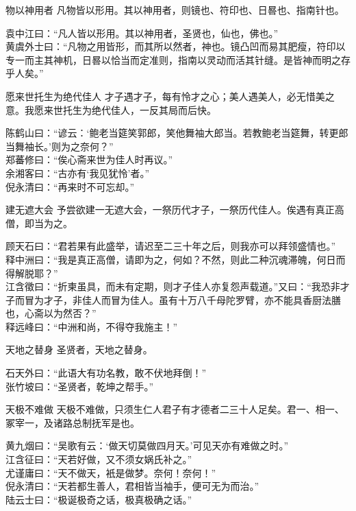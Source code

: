 \begin{yulu}{物以神用者}
凡物皆以形用。其以神用者，则镜也、符印也、日晷也、指南针也。
\begin{comments}
袁中江曰：“凡人皆以形用。其以神用者，圣贤也，仙也，佛也。” \\
黄虞外士曰：“凡物之用皆形，而其所以然者，神也。镜凸凹而易其肥瘦，符印以专一而主其神机，日晷以恰当而定准则，指南以灵动而活其针缝。是皆神而明之存乎人矣。”
\end{comments}
\end{yulu}

\begin{yulu}{愿来世托生为绝代佳人}
才子遇才子，每有怜才之心；美人遇美人，必无惜美之意。我愿来世托生为绝代佳人，一反其局而后快。
\begin{comments}
陈鹤山曰：“谚云：‘鲍老当筵笑郭郎，笑他舞袖大郎当。若教鲍老当筵舞，转更郎当舞袖长。’则为之奈何？” \\
郑蕃修曰：“俟心斋来世为佳人时再议。” \\
余湘客曰：“古亦有‘我见犹怜’者。” \\
倪永清曰：“再来时不可忘却。”
\end{comments}
\end{yulu}

\begin{yulu}{建无遮大会}
予尝欲建一无遮大会，一祭历代才子，一祭历代佳人。俟遇有真正高僧，即当为之。
\begin{comments}
顾天石曰：“君若果有此盛举，请迟至二三十年之后，则我亦可以拜领盛情也。” \\
释中洲曰：“我是真正高僧，请即为之，何如？不然，则此二种沉魂滞魄，何日而得解脱耶？” \\
江含徵曰：“折柬虽具，而未有定期，则才子佳人亦复怨声载道。”又曰：“我恐非才子而冒为才子，非佳人而冒为佳人。虽有十万八千母陀罗臂，亦不能具香厨法膳也，心斋以为然否？” \\
释远峰曰：“中洲和尚，不得夺我施主！”
\end{comments}
\end{yulu}

\begin{yulu}{天地之替身}
圣贤者，天地之替身。
\begin{comments}
石天外曰：“此语大有功名教，敢不伏地拜倒！” \\
张竹坡曰：“圣贤者，乾坤之帮手。”
\end{comments}
\end{yulu}

\begin{yulu}{天极不难做}
天极不难做，只须生仁人君子有才德者二三十人足矣。君一、相一、冢宰一，及诸路总制抚军是也。
\begin{comments}
黄九烟曰：“吴歌有云：‘做天切莫做四月天。’可见天亦有难做之时。” \\
江含征曰：“天若好做，又不须女娲氏补之。” \\
尤谨庸曰：“天不做天，衹是做梦。奈何！奈何！” \\
倪永清曰：“天若都生善人，君相皆当袖手，便可无为而治。” \\
陆云士曰：“极诞极奇之话，极真极确之话。”
\end{comments}
\end{yulu}

